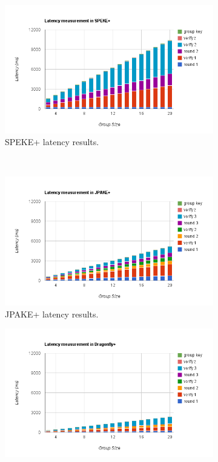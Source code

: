 \begin{figure}
    \centering
    \begin{subfigure}[b]{0.5\textwidth}
        \centering
        \includegraphics[width=\textwidth]{benchmark/speke.png}
        \caption{SPEKE+ latency results.}
        \label{fig:speke_results}
    \end{subfigure}
    ~
    \begin{subfigure}[b]{0.5\textwidth}
        \centering
        \includegraphics[width=\textwidth]{benchmark/scale_jpake.png}
        \caption{JPAKE+ latency results.}
        \label{fig:jpake_results}
    \end{subfigure}
    \begin{subfigure}[b]{0.5\textwidth}
        \centering
        \includegraphics[width=\textwidth]{benchmark/scale_dragon.png}

\end{subfigure}
\end{figure}
